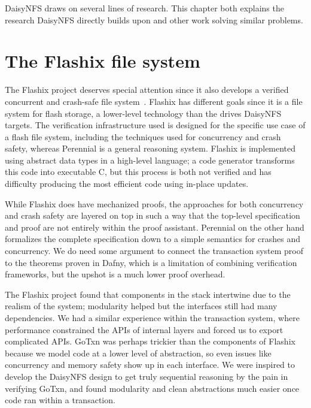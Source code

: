 DaisyNFS draws on several lines of research. This chapter both explains the
research DaisyNFS directly builds upon and other work solving similar problems.


\section{The Flashix file system}

The Flashix project deserves special attention since it also develops a verified
concurrent and crash-safe file system~\cite{bodenmuller:concurrent-flashix}.
Flashix has different goals since it is a file system for flash storage, a
lower-level technology than the drives DaisyNFS targets. The verification
infrastructure used is designed for the specific use case of a flash file
system, including the techniques used for concurrency and crash safety, whereas
Perennial is a general reasoning system. Flashix is implemented using abstract
data types in a high-level language; a code generator transforms this code into
executable C, but this process is both not verified and has difficulty producing
the most efficient code using in-place updates.

While Flashix does have mechanized proofs, the approaches for both concurrency
and crash safety are layered on top in such a way that the top-level
specification and proof are not entirely within the proof assistant. Perennial
on the other hand formalizes the complete specification down to a simple
semantics for crashes and concurrency. We do need some argument to connect the
transaction system proof to the theorems proven in Dafny, which is a limitation
of combining verification frameworks, but the upshot is a much lower proof
overhead.

The Flashix project found that components in the stack intertwine due to the
realism of the system; modularity helped but the interfaces still had many
dependencies. We had a similar experience within the transaction system, where
performance constrained the APIs of internal layers and forced us to export
complicated APIs. GoTxn was perhaps trickier than the components of Flashix
because we model code at a lower level of abstraction, so even issues like
concurrency and memory safety show up in each interface. We were inspired to
develop the DaisyNFS design to get truly sequential reasoning by the pain in
verifying GoTxn, and found modularity and clean abstractions much easier once
code ran within a transaction.

